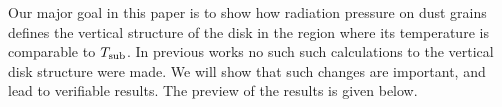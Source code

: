 \documentclass[12pt,english,preprint]{aastex}
\newcommand{\su}[2]{#1_{\rm #2}}
\newcommand{\Tsub}{ \su{T}{sub} }
\begin{document}
Our major goal in this paper is to show how radiation pressure on dust grains defines 
the vertical structure of the disk in the region where its temperature is comparable to $\Tsub$. 
In previous works no such such calculations to the vertical disk structure were made. 
We will show that such changes are important, and lead to verifiable
results. The preview of the results is given below.








\end{document}
